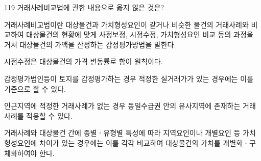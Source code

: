 \begin{question}{119}
거래사례비교법에 관한 내용으로 옳지 않은 것은?
\begin{choices}
  \item 거래사례비교법이란 대상물건과 가치형성요인이 같거나 비슷한 물건의 거래사례와 비교하여 대상물건의 현황에 맞게 사정보정, 시점수정, 가치형성요인 비교 등의 과정을 거쳐 대상물건의 가액을 산정하는 감정평가방법을 말한다.
  \item 시점수정은 대상물건의 가격 변동률로 함이 원칙이다.
  \item 감정평가법인등이 토지를 감정평가하는 경우 적정한 실거래가가 있는 경우에는 이를 기준으로 할 수 있다.
  \item 인근지역에 적정한 거래사례가 없는 경우 동일수급권 안의 유사지역에 존재하는 거래사례를 적용할 수 있다.
  \item 거래사례와 대상물건 간에 종별ㆍ유형별 특성에 따라 지역요인이나 개별요인 등 가치형성요인에 차이가 있는 경우에는 이를 각각 비교하여 대상물건의 가치를 개별화ㆍ구체화하여야 한다.
\end{choices}
\end{question}

